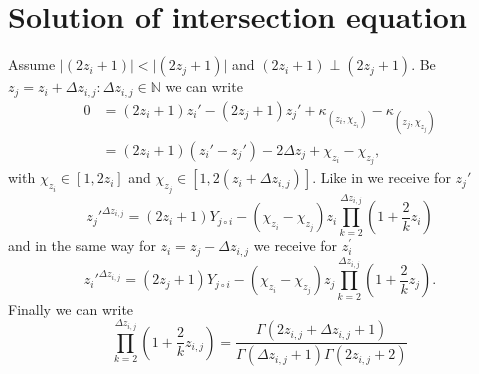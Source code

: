 \section{Solution of intersection equation}
\label{s:solutionofintersection}
Assume $\vert\left(2z_{i} + 1\right)\vert < \vert\left(2z_{j} + 1\right)\vert$ and $\left(2z_{i} + 1\right) \perp \left(2z_{j} + 1\right)$. Be $z_{j} = z_{i} + \Delta z_{i,j}:\Delta z_{i,j} \in \mathbb{N}$ we can write
\begin{equation}\begin{split}
	0 & = \left(2z_{i} + 1\right)z_{i}\prime - \left(2z_{j} + 1\right)z_{j}\prime + \kappa_{\left(z_{i}, \chi_{z_{i}}\right)} - \kappa_{\left(z_{j}, \chi_{z_{j}}\right)} \\
	& = \left(2z_{i} + 1\right)\left(z_{i}\prime - z_{j}\prime\right) - 2\Delta z_{j} + \chi_{z_{i}} - \chi_{z_{j}},
\end{split}\label{eq:intersectionDeltaz}\end{equation}
with $\chi_{z_{i}} \in [ 1, 2z_{i}]$ and $\chi_{z_{j}} \in [1, 2\left(z_{i} + \Delta z_{i,j}\right)]$. Like in \cite{2014arXiv1411.2824Z} we receive for $z_{j}\prime$
\begin{equation}
	z_{j}\prime^{\Delta z_{i,j}} = \left(2z_{i} + 1\right)Y_{j \circ i} - \left(\chi_{z_{i}} - \chi_{z_{j}}\right)z_{i}\prod_{k=2}^{\Delta z_{i,j}} \left(1 + \frac{2}{k}z_{i}\right)
\label{eq:zjsolution}\end{equation}
and in the same way for $z_{i} = z_{j} - \Delta z_{i,j}$ we receive for $z_{i}^{\prime}$
\begin{equation}
	z_{i}\prime^{\Delta z_{i,j}} = \left(2z_{j} + 1\right)Y_{j \circ i} - \left(\chi_{z_{i}} - \chi_{z_{j}}\right)z_{j}\prod_{k=2}^{\Delta z_{i,j}} \left(1 + \frac{2}{k}z_{j}\right).
\label{eq:zjsolution}\end{equation}
Finally we can write
\begin{equation}
	\prod_{k=2}^{\Delta z_{i,j}} \left(1 + \frac{2}{k}z_{i,j}\right) = \frac{\Gamma\left(2z_{i,j} + \Delta z_{i,j} + 1\right)}{\Gamma\left(\Delta z_{i,j} + 1\right)\Gamma\left(2z_{i,j} + 2\right)}
\label{eq:gammafunczsol}\end{equation}







\nocite{*}
\newpage
%



